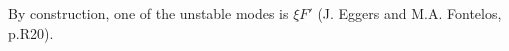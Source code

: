 \documentclass[
a4paper,%
10pt,%
titlepage,%
twoside%
]{article}
\begin{document}
By construction, one of the unstable modes is $\xi F'$ (J. Eggers and
M.A. Fontelos, p.R20).



\end{document}
